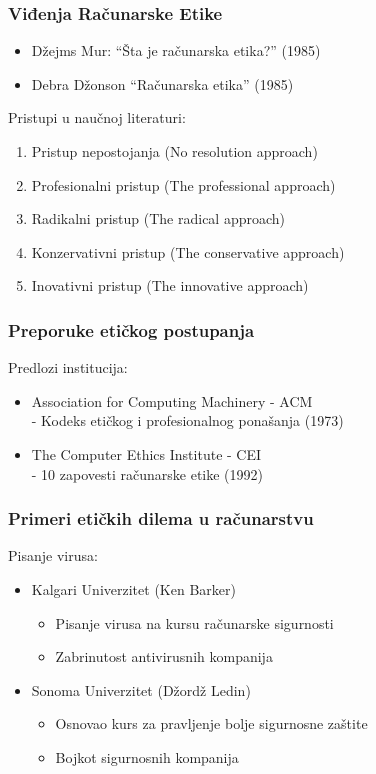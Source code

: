 \documentclass[pdf]{beamer}
\begin{document}
\begin{frame}
\frametitle{Viđenja Računarske Etike}

	\begin{itemize}

	\item Džejms Mur: ``Šta je računarska etika?'' (1985)

	\item Debra Džonson ``Računarska etika'' (1985)
	
	\end{itemize}

	Pristupi u naučnoj literaturi:
	\begin{enumerate}
	\item Pristup nepostojanja (No resolution approach)
	\item Profesionalni pristup (The professional approach)
	\item Radikalni pristup (The radical approach)
	\item Konzervativni pristup (The conservative approach)
	\item Inovativni pristup (The innovative approach)
	\end{enumerate}
	\end{frame}


\begin{frame}
\frametitle{Preporuke etičkog postupanja}



	Predlozi institucija:
	\begin{itemize}
		\item Association for Computing Machinery - ACM
		\\- Kodeks etičkog i profesionalnog ponašanja (1973)
		\item The Computer Ethics Institute - CEI
		\\- 10 zapovesti računarske etike (1992)
	\end{itemize}


\end{frame}


\begin{frame}
\frametitle{Primeri etičkih dilema u računarstvu}
		Pisanje virusa:
		\begin{itemize}
		\item Kalgari Univerzitet (Ken Barker)
			\begin{itemize}
			\item Pisanje virusa na kursu računarske sigurnosti
			\item Zabrinutost antivirusnih kompanija 
			\end{itemize}
		
		\item Sonoma Univerzitet (Džordž Ledin)
			\begin{itemize}
			\item Osnovao kurs za pravljenje bolje sigurnosne zaštite
			\item Bojkot sigurnosnih kompanija
			\end{itemize}
		\end{itemize}
\end{frame}
\end{document}

